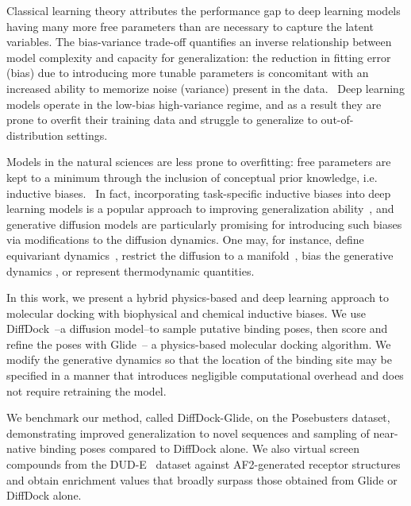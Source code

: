 Classical learning theory attributes the performance gap to deep learning models having many more free parameters than are necessary to capture the latent variables. The bias-variance trade-off quantifies an inverse relationship between model complexity and capacity for generalization: the reduction in fitting error (bias) due to introducing more tunable parameters  is concomitant with an increased ability to memorize noise (variance) present in the data.~\cite{geman1992neural} Deep learning models operate in the low-bias high-variance regime, and as a result they are prone to overfit their training data and struggle to generalize to out-of-distribution settings.~\cite{yoon2023diffusion}

Models in the natural sciences are less prone to overfitting: free parameters are kept to a minimum through the inclusion of conceptual prior knowledge, i.e. inductive biases.~\cite{mitchell1980need} In fact, incorporating task-specific inductive biases into deep learning models is a popular approach to improving generalization ability~\cite{fuchs2020equivariance,musaelian2023allegro}, and generative diffusion models are particularly promising for introducing such biases via modifications to the diffusion dynamics. One may, for instance, define equivariant dynamics~\cite{equivariant-diffusion-model}, restrict the diffusion to a manifold~\cite{jing2022torsional,de2022riemannian}, bias the generative dynamics \cite{corso2023particle}, or represent thermodynamic quantities.~\cite{herron2024inferring,exptm}

In this work, we present a hybrid physics-based and deep learning approach to molecular docking with biophysical and chemical inductive biases. We use DiffDock~\cite{diffdock}--a diffusion model--to sample putative binding poses, then score and refine the poses with Glide~\cite{friesner2004glide}-- a physics-based molecular docking algorithm. We modify the generative dynamics so that the location of the binding site may be specified in a manner that introduces negligible computational overhead and does not require retraining the model.

We benchmark our method, called DiffDock-Glide, on the Posebusters dataset, demonstrating improved generalization to novel sequences and sampling of near-native binding poses compared to DiffDock alone. We also virtual screen compounds from the DUD-E~\cite{mysinger2012dude} dataset against AF2-generated receptor structures and obtain enrichment values that broadly surpass those obtained from Glide or DiffDock alone.

